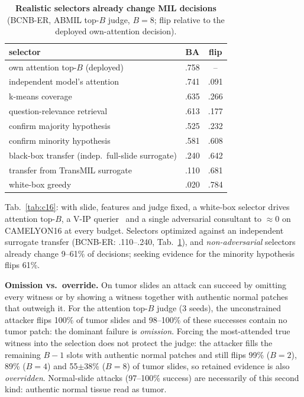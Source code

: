 \documentclass[10pt,twocolumn,letterpaper]{article}
\begin{document}
\begin{table}[t]\centering\small
\caption{\textbf{Realistic selectors already change MIL decisions} (BCNB-ER, ABMIL top-$B$ judge, $B{=}8$; flip relative to the deployed own-attention decision).}\label{tab:natural}
\begin{tabular}{@{}lcc@{}}\toprule
selector & BA & flip\\\midrule
own attention top-$B$ (deployed) & .758 & --\\
independent model's attention & .741 & .091\\
k-means coverage & .635 & .266\\
question-relevance retrieval & .613 & .177\\
confirm majority hypothesis & .525 & .232\\
confirm minority hypothesis & .581 & .608\\\midrule
black-box transfer (indep.\ full-slide surrogate) & .240 & .642\\
transfer from TransMIL surrogate & .110 & .681\\
white-box greedy & .020 & .784\\\bottomrule
\end{tabular}\end{table}

Tab.~\ref{tab:c16}: with slide, features and judge fixed, a white-box selector drives attention top-$B$, a V-IP querier~\cite{chattopadhyay2023vip} and a single adversarial consultant to $\approx$0 on CAMELYON16 at every budget. Selectors optimized against an independent surrogate transfer (BCNB-ER: .110--.240, Tab.~\ref{tab:natural}), and \emph{non-adversarial} selectors already change 9--61\% of decisions; seeking evidence for the minority hypothesis flips 61\%.

\textbf{Omission vs.\ override.} On tumor slides an attack can succeed by omitting every witness or by showing a witness together with authentic normal patches that outweigh it. For the attention top-$B$ judge (3 seeds), the unconstrained attacker flips 100\% of tumor slides and 98--100\% of these successes contain no tumor patch: the dominant failure is \emph{omission}. Forcing the most-attended true witness into the selection does not protect the judge: the attacker fills the remaining $B{-}1$ slots with authentic normal patches and still flips 99\% ($B{=}2$), 89\% ($B{=}4$) and 55$\pm$38\% ($B{=}8$) of tumor slides, so retained evidence is also \emph{overridden}. Normal-slide attacks (97--100\% success) are necessarily of this second kind: authentic normal tissue read as tumor.
\end{document}
